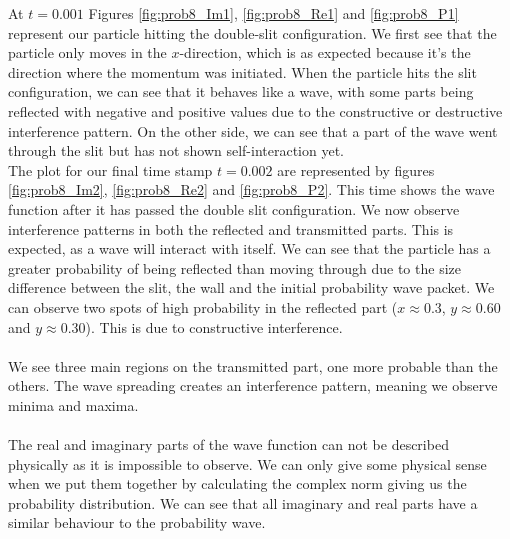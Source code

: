 \documentclass[english,notitlepage,reprint,nofootinbib]{revtex4-2}  %
\begin{document}
	\noindent
	At $t=0.001$ Figures \ref{fig:prob8_Im1}, \ref{fig:prob8_Re1} and \ref{fig:prob8_P1}
	represent our particle hitting the double-slit configuration. We first see that the
	particle only moves in the $x$-direction, which is as expected because it's the direction where the momentum was initiated. When the particle hits the slit configuration, we can see that it behaves like a wave, with some parts being reflected with negative and positive values due to the constructive or destructive interference pattern. On the other side, we can see that a part of the wave went through the slit but has not shown self-interaction yet. \\

	\noindent
	The plot for our final time stamp $t=0.002$ are represented by
	figures \ref{fig:prob8_Im2}, \ref{fig:prob8_Re2} and \ref{fig:prob8_P2}.
	This time shows the wave function after it has passed the double slit configuration.
	We now observe interference patterns in both the reflected and transmitted parts. This is expected, as a wave will interact with itself. We can see that the particle has a greater probability of being reflected than moving through due to the size difference
	between the slit, the wall and the initial probability wave packet. We can observe two spots of high probability in
	the reflected part ($x\approx0.3$, $y\approx0.60$ and $y\approx0.30$). This is due to constructive interference.
	\\
	\noindent \\
	We see three main regions on the transmitted part, one more probable than the others. The wave spreading creates an interference pattern, meaning we observe minima and maxima. \\
	\noindent \\
	The real and imaginary parts of the wave function can not be described physically as it is impossible to observe. We can only give some physical sense when we put them
	together by calculating the complex norm giving us the probability distribution. We can
	see that all imaginary and real parts have a similar behaviour to the probability wave.\\
\end{document}
